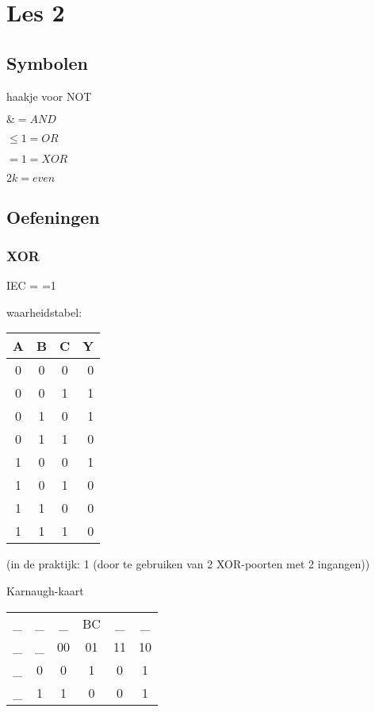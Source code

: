 \documentclass[11pt, a4paper]{article}
\begin{document}
\newpage

\section{Les 2}

\subsection{Symbolen}

haakje voor NOT

$\& = AND$

$\le1 = OR$

$=1 = XOR$

$2k = even$

\subsection{Oefeningen}

\subsubsection{XOR}

IEC = =1

waarheidstabel:

\begin{tabular}{c c c || r}
A & B & C & Y \\
\hline
0 & 0 & 0 & 0 \\
0 & 0 & 1 & 1 \\
0 & 1 & 0 & 1 \\
0 & 1 & 1 & 0 \\
1 & 0 & 0 & 1 \\
1 & 0 & 1 & 0 \\
1 & 1 & 0 & 0 \\
1 & 1 & 1 & 0 \\
\end{tabular}

(in de praktijk: 1 (door te gebruiken van 2 XOR-poorten met 2 ingangen))

Karnaugh-kaart

\begin{tabular}{c c | c | c | c | c |}
  \_ & \_ & \_ & BC & \_ & \_\\
  \_ & \_ & 00 & 01 & 11 & 10 \\
   \hline
   \_ & 0 &  0 & 1 & 0 & 1 \\
   \hline
   \_ & 1 &  1 & 0 & 0 & 1 \\
   \hline
\end{tabular}
\end{document}
